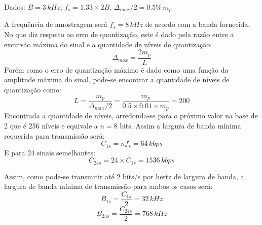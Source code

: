 Dados: $B=3 \, kHz$, $f_s = 1.33\times2B$, $\Delta_{max}/2=0.5\% \, m_p$ 

A frequência de amostragem será $f_s = 8 \, kHz$ de acordo com a banda fornecida. No que diz respeito ao erro de quantização, este é dado pela razão entre a excursão máxima do sinal e a quantidade de níveis de quantização:
\begin{equation}
	\Delta_{max} = \frac{2m_p}{L} 
\end{equation}
Porém como o erro de quantização máximo é dado como uma função da amplitude máxima do sinal, pode-se encontrar a quantidade de níveis de quantização como:
\begin{equation}
	L = \frac{m_p}{\Delta_{max}/2} = \frac{m_p}{0.5\times0.01\times m_p} = 200 
\end{equation}
Encontrada a quantidade de níveis, arredonda-se para o próximo valor na base de 2 que é 256 níveis e equivale a $n=8$ bits. Assim a largura de banda mínima requerida para transmissão será:
\begin{equation}
	C_{1s} = nf_s = 64 \, kbps 
\end{equation}
E para 24 sinais semelhantes:
\begin{equation}
	C_{24s} = 24\times C_{1s} = 1536 \, kbps 
\end{equation}

Assim, como pode-se transmitir até 2 bits/s por hertz de largura de banda, a largura de
banda mínima de transmissão para ambos os casos será:
\begin{equation}
	B_{1s} = \frac{C_{1s}}{2} = 32 \, kHz 
\end{equation}
\begin{equation}
	B_{24s} = \frac{C_{24s}}{2} = 768 \, kHz 
\end{equation}